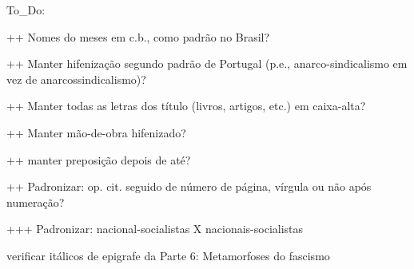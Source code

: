To_Do:

++ Nomes do meses em c.b., como padrão no Brasil?

++ Manter hifenização segundo padrão de Portugal (p.e., anarco-sindicalismo em vez de anarcossindicalismo)?

++ Manter todas as letras dos título (livros, artigos, etc.) em caixa-alta?

++ Manter mão-de-obra hifenizado?

++ manter preposição depois de até?

++ Padronizar: op. cit. seguido de número de página, vírgula ou não após numeração?


+++ Padronizar: nacional-socialistas X nacionais-socialistas

verificar itálicos de epigrafe da Parte 6: Metamorfoses do fascismo